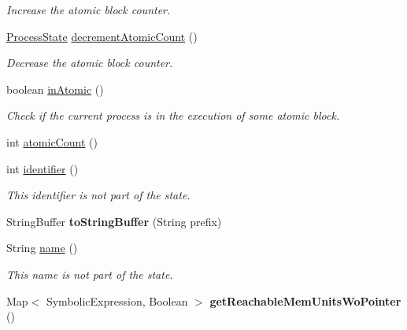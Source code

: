 \begin{DoxyCompactItemize}
\begin{DoxyCompactList}\small\item\em Increase the atomic block counter. \end{DoxyCompactList}\item 
\hyperlink{interfaceedu_1_1udel_1_1cis_1_1vsl_1_1civl_1_1state_1_1IF_1_1ProcessState}{Process\+State} \hyperlink{interfaceedu_1_1udel_1_1cis_1_1vsl_1_1civl_1_1state_1_1IF_1_1ProcessState_a06269068708f12aabc1c65ef99333dd1}{decrement\+Atomic\+Count} ()
\begin{DoxyCompactList}\small\item\em Decrease the atomic block counter. \end{DoxyCompactList}\item 
boolean \hyperlink{interfaceedu_1_1udel_1_1cis_1_1vsl_1_1civl_1_1state_1_1IF_1_1ProcessState_a769482476680cd57a4cfbee3449c3b01}{in\+Atomic} ()
\begin{DoxyCompactList}\small\item\em Check if the current process is in the execution of some atomic block. \end{DoxyCompactList}\item 
int \hyperlink{interfaceedu_1_1udel_1_1cis_1_1vsl_1_1civl_1_1state_1_1IF_1_1ProcessState_a024696cc7cc27f3fbbe48d98e2969d8a}{atomic\+Count} ()
\item 
int \hyperlink{interfaceedu_1_1udel_1_1cis_1_1vsl_1_1civl_1_1state_1_1IF_1_1ProcessState_a75eb2fe10d87bb0257930df52a4a9868}{identifier} ()
\begin{DoxyCompactList}\small\item\em This identifier is not part of the state. \end{DoxyCompactList}\item 
\hypertarget{interfaceedu_1_1udel_1_1cis_1_1vsl_1_1civl_1_1state_1_1IF_1_1ProcessState_a6c10a95481c5c9b674b5e1cb966122f1}{}String\+Buffer {\bfseries to\+String\+Buffer} (String prefix)\label{interfaceedu_1_1udel_1_1cis_1_1vsl_1_1civl_1_1state_1_1IF_1_1ProcessState_a6c10a95481c5c9b674b5e1cb966122f1}

\item 
String \hyperlink{interfaceedu_1_1udel_1_1cis_1_1vsl_1_1civl_1_1state_1_1IF_1_1ProcessState_a00f957b14faf3da1bd93941b096b5ab8}{name} ()
\begin{DoxyCompactList}\small\item\em This name is not part of the state. \end{DoxyCompactList}\item 
\hypertarget{interfaceedu_1_1udel_1_1cis_1_1vsl_1_1civl_1_1state_1_1IF_1_1ProcessState_a8d926ecc5fce4dfb35837fa059a0504b}{}Map$<$ Symbolic\+Expression, Boolean $>$ {\bfseries get\+Reachable\+Mem\+Units\+Wo\+Pointer} ()\label{interfaceedu_1_1udel_1_1cis_1_1vsl_1_1civl_1_1state_1_1IF_1_1ProcessState_a8d926ecc5fce4dfb35837fa059a0504b}


\end{DoxyCompactItemize}
